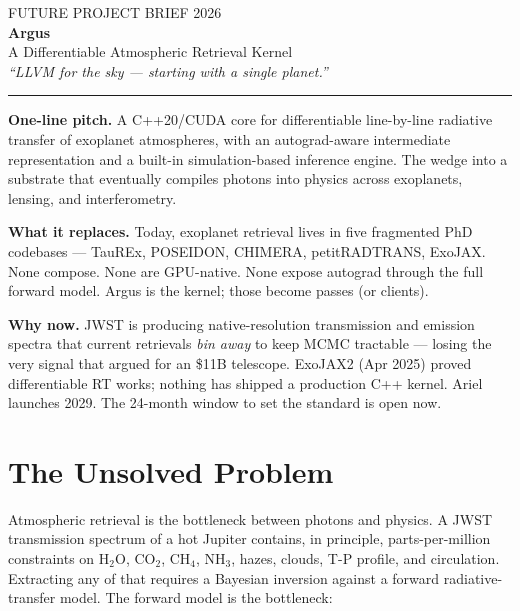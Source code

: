 \documentclass[11pt,a4paper]{article}
\begin{document}
\begin{center}
  \vspace*{-1.2cm}
  {\color{muted}\small FUTURE PROJECT BRIEF \textbullet{} 2026}\\[0.4em]
  {\color{primary}\Huge\bfseries Argus}\\[0.3em]
  {\color{dark}\Large A Differentiable Atmospheric Retrieval Kernel}\\[0.2em]
  {\color{muted}\itshape ``LLVM for the sky --- starting with a single planet.''}\\[0.4em]
  \rule{0.35\textwidth}{0.5pt}
\end{center}

\vspace{0.6em}

\begin{callout}
\textbf{One-line pitch.} A C++20/CUDA core for differentiable line-by-line radiative transfer of exoplanet atmospheres, with an autograd-aware intermediate representation and a built-in simulation-based inference engine. The wedge into a substrate that eventually compiles photons into physics across exoplanets, lensing, and interferometry.

\vspace{0.4em}
\textbf{What it replaces.} Today, exoplanet retrieval lives in five fragmented PhD codebases --- TauREx, POSEIDON, CHIMERA, petitRADTRANS, ExoJAX. None compose. None are GPU-native. None expose autograd through the full forward model. Argus is the kernel; those become passes (or clients).

\vspace{0.4em}
\textbf{Why now.} JWST is producing native-resolution transmission and emission spectra that current retrievals \emph{bin away} to keep MCMC tractable --- losing the very signal that argued for an \$11B telescope. ExoJAX2 (Apr 2025) proved differentiable RT works; nothing has shipped a production C++ kernel. Ariel launches 2029. The 24-month window to set the standard is open now.
\end{callout}

\section{The Unsolved Problem}

Atmospheric retrieval is the bottleneck between photons and physics. A JWST transmission spectrum of a hot Jupiter contains, in principle, parts-per-million constraints on $\mathrm{H_2O}$, $\mathrm{CO_2}$, $\mathrm{CH_4}$, $\mathrm{NH_3}$, hazes, clouds, T-P profile, and circulation. Extracting any of that requires a Bayesian inversion against a forward radiative-transfer model. The forward model is the bottleneck:
\end{document}
